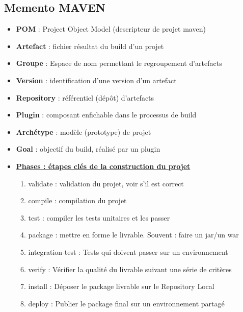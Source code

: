 \documentclass[11pt,twoside,a4paper]{article}
\begin{document}
\begin{landscape}
\begin{multicols}{2}
	\vfill
	
	\columnbreak
	
	\section*{Memento MAVEN}
	
	\begin{itemize}
		\item \textbf{POM} : Project Object Model (descripteur de projet maven)
		\item \textbf{Artefact} : fichier résultat du build d'un projet
		\item \textbf{Groupe} : Espace de nom permettant le regroupement d'artefacts
		\item \textbf{Version} : identification d'une version d'un artefact
		\item \textbf{Repository} : référentiel (dépôt) d'artefacts
		\item \textbf{Plugin} : composant enfichable dans le processus de build
		\item \textbf{Archétype} : modèle (prototype) de projet
		\item \textbf{Goal} : objectif du build, réalisé par un plugin
		\item \underline{\textbf{Phases : étapes clés de la construction du projet}}
		\begin{enumerate}
			\item \textsf{validate} : validation du projet, voir s'il est correct
			\item \textsf{compile} : compilation du projet
			\item \textsf{test} : compiler les tests unitaires et les passer
			\item \textsf{package} : mettre en forme le livrable. Souvent : faire un jar/un war
			\item \textsf{integration-test} : Tests qui doivent passer sur un environnement
			\item \textsf{verify} : Vérifier la qualité du livrable suivant une série de critères
			\item \textsf{install} : Déposer le package livrable sur le Repository Local
			\item \textsf{deploy} : Publier le package final sur un environnement partagé
		\end{enumerate}

\end{itemize}
\end{multicols}
\end{landscape}
\end{document}
